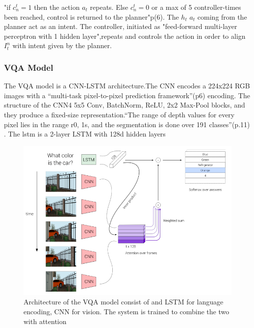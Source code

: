 "if \begin{math} c_{n}^{t} = 1 \end{math} then the action \begin{math} a_{t} \end{math} repeats. Else \begin{math} c_{n}^{t} = 0 \end{math} or a max of 5 controller-times been reached, control is returned to the planner"p(6). The \begin{math} h_{t} \end{math}   \begin{math} a_{t} \end{math} coming from the planner act as an intent. The controller, initiated  as "feed-forward multi-layer perceptron with 1 hidden layer",repeats and controls the action in order to align \begin{math}  I_{t}^{n} \end{math} with intent given by the planner. 

\subsubsection{VQA Model}



The VQA model is a CNN-LSTM architecture.The CNN encodes a 224x224 RGB images with a “multi-task pixel-to-pixel prediction framework”(p6) encoding. The structure of the CNN4 {5x5 Conv, BatchNorm, ReLU, 2x2 Max-Pool blocks}, and they produce a fixed-size representation.“The range of depth values for every pixel lies in the range r0, 1s, and the segmentation is done over 191 classes”(p.11) \cite{embodiedqa} . The lstm is a 2-layer LSTM with 128d hidden layers





\begin{figure}[H]
\centering
\includegraphics[scale=0.35]{latex/images/VQA.png}
\caption{Architecture of the VQA model consist of and LSTM for language encoding, CNN for vision. The system is trained to combine the two with attention}
\label{fig:VQ}
\end{figure}



